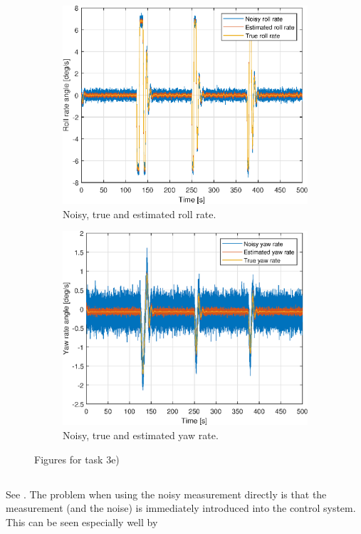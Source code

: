 \begin{figure}[ht]
\begin{subfigure}[b]{0.45\textwidth}
		\includegraphics[width=\textwidth]{figures/3e/roll_rate_p.eps}
		\caption{Noisy, true and estimated roll rate. }
		\label{fig:3e_roll_rate_p}
	\end{subfigure}
	\begin{subfigure}[b]{0.45\textwidth}
		\includegraphics[width=\textwidth]{figures/3e/yaw_rate_r.eps}
		\caption{Noisy, true and estimated yaw rate. }
		\label{fig:3e_yaw_rate_r}
	\end{subfigure}		
	\caption{Figures for task 3e)}\label{fig:3e}
\end{figure}

\subsection{} %
See . The problem when using the noisy measurement directly is that the measurement (and the noise) is immediately introduced into the control system. This can be seen especially well by 


